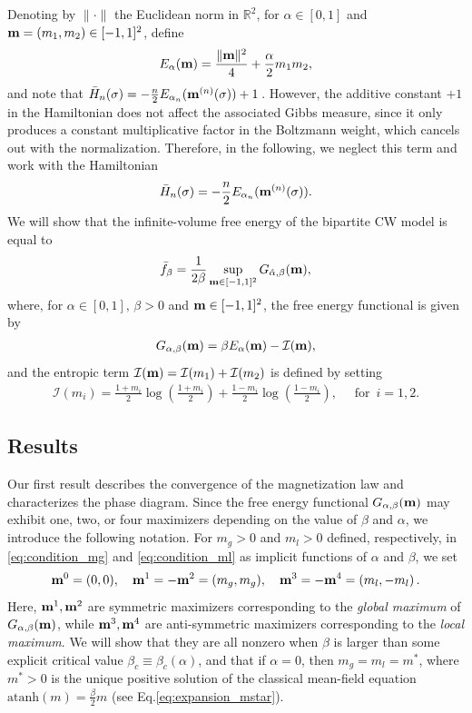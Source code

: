 \documentclass[11pt,oneside]{amsart}
\numberwithin{equation}{section}  %
\theoremstyle{plain}
\theoremstyle{remark}
\def \R {{\mathbb R}}
\def \s {{\sigma}}
\def \bm {{\bf m}}
\begin{document}
Denoting by $\|\cdot\|$ the Euclidean norm in $\R^2$, for $\alpha \in [0,1]$ and $\bm=(m_1,m_2) \in [-1,1]^2$, define
\begin{align}\label{def:E}
    E_{\alpha}(\bm)=\frac{\|\bm\|^2}{4} +\frac{\alpha}{2} m_1m_2,
\end{align}
and note that $\bar{H}_n(\sigma)=-\frac{n}{2} E_{\alpha_n}(\bm^{(n)}(\s)) +1\,$.
However, the additive constant $+1$ in the  Hamiltonian does not affect the associated Gibbs measure, 
since it only produces a  constant multiplicative factor in the Boltzmann weight, which cancels out with the normalization. 
Therefore, in the following, we neglect this term and work with the Hamiltonian
\begin{align}\label{def:hamiltonian_CW_magnet}
\bar{H}_n(\sigma)=-\frac{n}{2} E_{\alpha_n}(\bm^{(n)}(\s)).
\end{align}
We will show that the infinite-volume free energy of the bipartite CW model is equal to
\begin{align*}
    \bar{f}_{\beta}=\frac{1}{2 \beta}\sup_{\bm \in [-1,1]^2} G_{\hat \alpha,\beta}(\bm),
\end{align*}
where, for $\alpha\in[0,1],\, \beta> 0$ and $\bm\in[-1,1]^2$, the free energy functional is given by
\begin{align}\label{def:free_energy_functional_CW}
    G_{\alpha,\beta}(\bm)= \beta E_{\alpha}(\bm )-\mathcal{I}(\bm),
\end{align}
and the entropic term $\mathcal{I}({\bf{m}})=\mathcal{I}(m_1)+\mathcal{I}(m_2)$
is defined by setting   
\begin{align*}
\mathcal{I}(m_i)=\frac{1+m_i}{2}\log \left ( \frac{1+m_i}{2} \right )+\frac{1-m_i}{2}\log \left ( \frac{1-m_i}{2} \right ),\quad \mbox{ for }\, i=1,2.
\end{align*}

\subsection{Results}
Our first result describes the convergence of the magnetization law and characterizes the phase diagram. Since the free energy functional $G_{\alpha,\beta}(\bm)$ may exhibit one, two, or four maximizers depending on the value of $\beta$ and $\alpha$, 
we introduce the following notation. For $m_g>0$ and $m_l>0$ defined,  respectively, 
in \eqref{eq:condition_mg} and \eqref{eq:condition_ml}  as implicit functions of $\alpha$ and $\beta$, we set
\begin{equation*}
\bm^0=(0,0), \quad \bm^1=-\bm^2 =(m_g,m_g), \quad \bm^3=-\bm^4=(m_l,- m_l)\,.
\end{equation*}
Here, $\bm^1, \bm^2$ are symmetric maximizers  corresponding to the \textit{global maximum} of $G_{\alpha,\beta}(\bm)$, 
while $\bm^3, \bm^4$ are anti-symmetric maximizers  corresponding to the \textit{local maximum}. 
We will show that they are all nonzero when $\beta$ is larger than some explicit critical value $\beta_c\equiv\beta_c(\alpha)$,  
and that if $\alpha=0$, then $m_g=m_l=m^*$,  where $m^*>0$ is the unique positive solution of the classical mean-field equation $\mathrm{atanh}(m)=\frac{\beta}{2}m$
(see Eq.\eqref{eq:expansion_mstar}).
\end{document}
